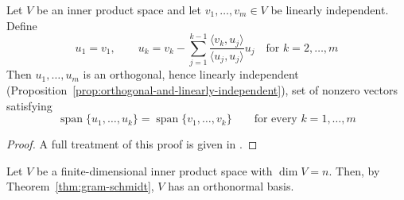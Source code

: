 		\begin{theorem}
			\label{thm:gram-schmidt}
			Let $V$ be an inner product space and let $v_1, \dots, v_m \in V$ be linearly independent. Define
			\[
				u_1 = v_1, \qquad u_k = v_k - \sum_{j=1}^{k-1} \frac{\langle v_k, u_j \rangle}{\langle u_j, u_j \rangle} u_j \quad \text{for } k = 2, \dots, m
			\]
			Then $u_1, \dots, u_m$ is an orthogonal, hence linearly independent (Proposition~\ref{prop:orthogonal-and-linearly-independent}), set of nonzero vectors satisfying
			\[
				\operatorname{span}\{u_1, \dots, u_k\} = \operatorname{span}\{v_1, \dots, v_k\} \qquad \text{for every } k = 1, \dots, m
			\]
		\end{theorem}
		
		\begin{proof}
			A full treatment of this proof is given in \cite[\S5.2]{GolubVanLoan2013}.
		\end{proof}
		
		\begin{corollary}
			\label{cor:orthonormal-basis-exists}
			Let $V$ be a finite-dimensional inner product space with $\dim V = n$. Then, by Theorem~\ref{thm:gram-schmidt}, $V$ has an orthonormal basis.
		\end{corollary}
		
